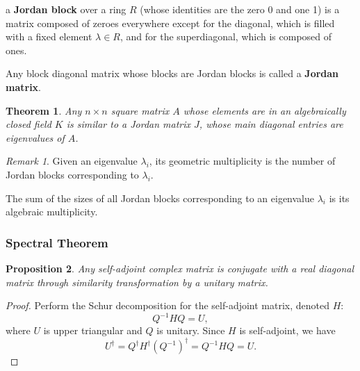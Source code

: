 \documentclass[12pt, letterpaper]{article}
\newcommand{\hadj}[1]{{#1}^{\dagger}}
\newtheorem{prop}{Proposition}[section]
\newtheorem{thm}[prop]{Theorem}
\theoremstyle{definition}
\theoremstyle{remark}
\newtheorem*{rem*}{Remark}
\theoremstyle{definition}
\theoremstyle{plain}
\begin{document}
	\begin{def*}
		a \textbf{Jordan block} over a ring $R$ (whose identities are the zero 0 and one 1) is a matrix composed of zeroes everywhere except for the diagonal, which is filled with a fixed element $\lambda \in R$, and for the superdiagonal, which is composed of ones. 
	\end{def*}
	\begin{def*}
		Any block diagonal matrix whose blocks are Jordan blocks is called a \textbf{Jordan matrix}.
	\end{def*}
	\begin{thm}
		Any $n \times n$ square matrix $A$ whose elements are in an algebraically closed field $K$ is similar to a Jordan matrix $J$,
		whose main diagonal entries are eigenvalues of $A$.
	\end{thm}
	\begin{rem*}
		Given an eigenvalue $\lambda_i$, its geometric multiplicity is the number of Jordan blocks corresponding to $\lambda_i$.
		
		The sum of the sizes of all Jordan blocks corresponding to an eigenvalue $\lambda_i$ is its algebraic multiplicity.
	\end{rem*}
	
	\subsubsection*{Spectral Theorem}
	\begin{prop}
		Any self-adjoint complex matrix is conjugate with a real diagonal matrix
		through similarity transformation by a unitary matrix.
	\end{prop}
	\begin{proof}
		Perform the Schur decomposition for the self-adjoint matrix, denoted $H$:
		\[ Q^{-1}HQ=U, \]
		where $U$ is upper triangular and $Q$ is unitary.
		Since $H$ is self-adjoint, we have
		\[ \hadj{U} = \hadj{Q}\hadj{H}\hadj{(Q^{-1})}=Q^{-1}HQ=U.\]
	\end{proof}
	
\end{document}
